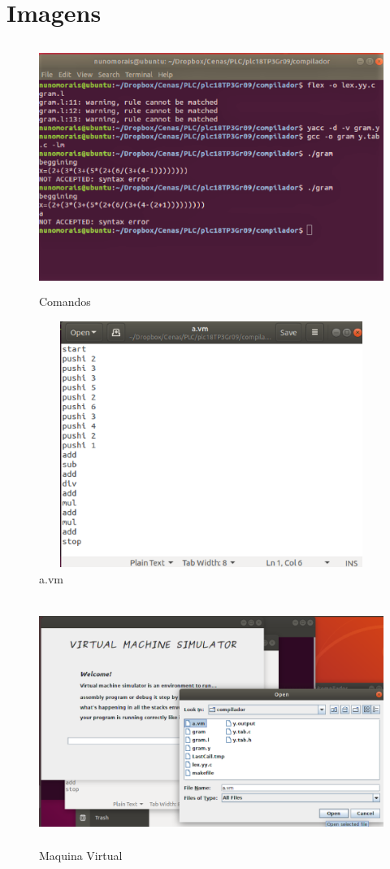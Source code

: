 \documentclass{report}
\begin{document}
\appendix
\chapter{Imagens}

\begin{figure}[ht]
	\centering
	\includegraphics[width=14cm,height= 8cm]{comandos.eps}
	\caption{Comandos}
	\label{Exemplo}
\end{figure}

\begin{figure}[ht]
	\centering
	\includegraphics[width=14cm,height= 8cm]{a_vm.eps}
	\caption{a.vm}
	\label{a.vm}
\end{figure}

\begin{figure}[ht]
	\centering
	\includegraphics[width=14cm,height= 8cm]{vm1.eps}
	\caption{Maquina Virtual}
	\label{vm1}
\end{figure}
\end{document}

